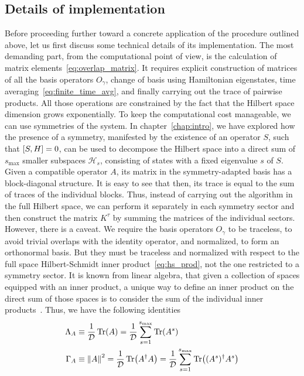 \subsection{Details of implementation}

Before proceeding further toward a concrete application of the procedure outlined above, let us first discuss
 some technical details of its implementation. The most demanding part, from the computational point of view,
 is the calculation of matrix elements~\eqref{eq:overlap_matrix}. It requires explicit construction of
 matrices of all the basis operators \(O_{\gamma}\), change of basis using Hamiltonian eigenstates,
 time averaging~\eqref{eq:finite_time_avg}, and finally carrying out the trace of pairwise products.
 All those operations are constrained by the fact that the Hilbert space dimension grows exponentially.
 To keep the computational cost manageable, we can use symmetries of the system. In chapter~\ref{chap:intro}, we
 have explored how the presence of a symmetry, manifested by the existence of an operator \(S\), such
 that \(\comm{S}{H} = 0\), can be used to decompose the Hilbert space into a direct sum of \(s_{\text{max}}\) smaller
  subspaces \(\mathcal{H}_{s}\), consisting of states with a fixed eigenvalue \(s\) of \(S\). Given a
  compatible operator \(A\), its matrix in the symmetry-adapted basis has a block-diagonal structure.
  It is easy to see that then, its trace is equal to the sum of traces of the individual blocks.
  Thus, instead of carrying out the algorithm in the full Hilbert space, we can perform it separately
  in each symmetry sector and then construct the matrix \(K^{\tau}\) by summing the matrices of the
  individual sectors. However, there is a caveat. We require the basis operators \(O_{\gamma}\) to be
  traceless, to avoid trivial overlaps with the identity operator, and normalized, to form an orthonormal
  basis. But they must be traceless and normalized with respect to the full space Hilbert-Schmidt inner
  product~\eqref{eq:hs_prod}, not the one restricted to a symmetry sector. It is known from linear algebra,
  that given a collection of spaces equipped with an inner product, a unique way to define an inner product
  on the direct sum of those spaces is to consider the sum of the individual inner products~\autocite{Conway2007}.
  Thus, we have the following identities
  \begin{align}
    \Lambda_A &\equiv \frac{1}{\mathcal{D}} \Tr(A) = \frac{1}{\mathcal{D}} \sum_{s=1}^{s_{\text{max}}} \Tr(A^s)\\
    \Gamma_A &\equiv \norm{A}^2 = \frac{1}{\mathcal{D}} \Tr(A^{\dag}A) = \frac{1}{\mathcal{D}} \sum_{s=1}^{s_{\text{max}}} \Tr((A^s)^{\dag}A^s)
  \end{align}
